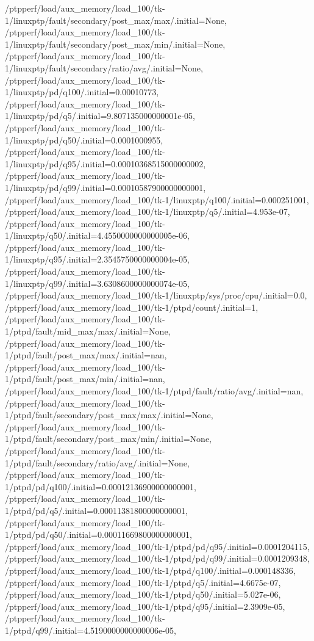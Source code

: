 {    /ptpperf/load/aux_memory/load_100/tk-1/linuxptp/fault/secondary/post_max/max/.initial=None,
    /ptpperf/load/aux_memory/load_100/tk-1/linuxptp/fault/secondary/post_max/min/.initial=None,
    /ptpperf/load/aux_memory/load_100/tk-1/linuxptp/fault/secondary/ratio/avg/.initial=None,
    /ptpperf/load/aux_memory/load_100/tk-1/linuxptp/pd/q100/.initial=0.00010773,
    /ptpperf/load/aux_memory/load_100/tk-1/linuxptp/pd/q5/.initial=9.807135000000001e-05,
    /ptpperf/load/aux_memory/load_100/tk-1/linuxptp/pd/q50/.initial=0.0001000955,
    /ptpperf/load/aux_memory/load_100/tk-1/linuxptp/pd/q95/.initial=0.00010368515000000002,
    /ptpperf/load/aux_memory/load_100/tk-1/linuxptp/pd/q99/.initial=0.00010587900000000001,
    /ptpperf/load/aux_memory/load_100/tk-1/linuxptp/q100/.initial=0.000251001,
    /ptpperf/load/aux_memory/load_100/tk-1/linuxptp/q5/.initial=4.953e-07,
    /ptpperf/load/aux_memory/load_100/tk-1/linuxptp/q50/.initial=4.4550000000000005e-06,
    /ptpperf/load/aux_memory/load_100/tk-1/linuxptp/q95/.initial=2.3545750000000004e-05,
    /ptpperf/load/aux_memory/load_100/tk-1/linuxptp/q99/.initial=3.6308600000000074e-05,
    /ptpperf/load/aux_memory/load_100/tk-1/linuxptp/sys/proc/cpu/.initial=0.0,
    /ptpperf/load/aux_memory/load_100/tk-1/ptpd/count/.initial=1,
    /ptpperf/load/aux_memory/load_100/tk-1/ptpd/fault/mid_max/max/.initial=None,
    /ptpperf/load/aux_memory/load_100/tk-1/ptpd/fault/post_max/max/.initial=nan,
    /ptpperf/load/aux_memory/load_100/tk-1/ptpd/fault/post_max/min/.initial=nan,
    /ptpperf/load/aux_memory/load_100/tk-1/ptpd/fault/ratio/avg/.initial=nan,
    /ptpperf/load/aux_memory/load_100/tk-1/ptpd/fault/secondary/post_max/max/.initial=None,
    /ptpperf/load/aux_memory/load_100/tk-1/ptpd/fault/secondary/post_max/min/.initial=None,
    /ptpperf/load/aux_memory/load_100/tk-1/ptpd/fault/secondary/ratio/avg/.initial=None,
    /ptpperf/load/aux_memory/load_100/tk-1/ptpd/pd/q100/.initial=0.00012136900000000001,
    /ptpperf/load/aux_memory/load_100/tk-1/ptpd/pd/q5/.initial=0.00011381800000000001,
    /ptpperf/load/aux_memory/load_100/tk-1/ptpd/pd/q50/.initial=0.00011669800000000001,
    /ptpperf/load/aux_memory/load_100/tk-1/ptpd/pd/q95/.initial=0.0001204115,
    /ptpperf/load/aux_memory/load_100/tk-1/ptpd/pd/q99/.initial=0.0001209348,
    /ptpperf/load/aux_memory/load_100/tk-1/ptpd/q100/.initial=0.000148336,
    /ptpperf/load/aux_memory/load_100/tk-1/ptpd/q5/.initial=4.6675e-07,
    /ptpperf/load/aux_memory/load_100/tk-1/ptpd/q50/.initial=5.027e-06,
    /ptpperf/load/aux_memory/load_100/tk-1/ptpd/q95/.initial=2.3909e-05,
    /ptpperf/load/aux_memory/load_100/tk-1/ptpd/q99/.initial=4.5190000000000006e-05,
}
